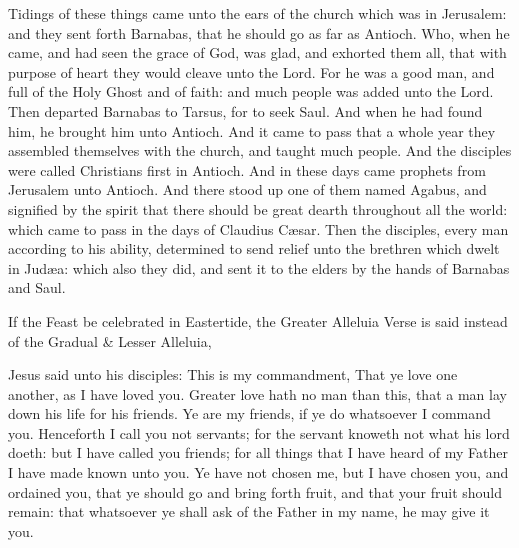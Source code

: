  Tidings of these things came unto the ears of the church which was in Jerusalem: and they sent forth Barnabas, that he should go as far as Antioch. Who, when he came, and had seen the grace of God, was glad, and exhorted them all, that with purpose of heart they would cleave unto the Lord. For he was a good man, and full of the Holy Ghost and of faith: and much people was added unto the Lord. Then departed Barnabas to Tarsus, for to seek Saul. And when he had found him, he brought him unto Antioch. And it came to pass that a whole year they assembled themselves with the church, and taught much people. And the disciples were called Christians first in Antioch. And in these days came prophets from Jerusalem unto Antioch. And there stood up one of them named Agabus, and signified by the spirit that there should be great dearth throughout all the world: which came to pass in the days of Claudius C{\ae}sar. Then the disciples, every man according to his ability, determined to send relief unto the brethren which dwelt in Jud{\ae}a: which also they did, and sent it to the elders by the hands of Barnabas and Saul.


\begin{rubric}
    If the Feast be celebrated in Eastertide, the Greater Alleluia Verse is said instead of the Gradual \& Lesser Alleluia,
\end{rubric}

 Jesus said unto his disciples: This is my commandment, That ye love one another, as I have loved you. Greater love hath no man than this, that a man lay down his life for his friends. Ye are my friends, if ye do whatsoever I command you. Henceforth I call you not servants; for the servant knoweth not what his lord doeth: but I have called you friends; for all things that I have heard of my Father I have made known unto you. Ye have not chosen me, but I have chosen you, and ordained you, that ye should go and bring forth fruit, and that your fruit should remain: that whatsoever ye shall ask of the Father in my name, he may give it you.

